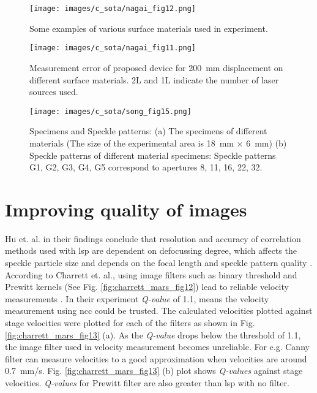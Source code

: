     \begin{figure}[h]
        \centering
        \texttt{[image: images/c\_sota/nagai\_fig12.png]}
        \caption{Some examples of various surface materials used in experiment. \cite{nagai}}
        \label{fig:nagai_fig12}
    \end{figure}

    \begin{figure}[h]
        \centering
        \texttt{[image: images/c\_sota/nagai\_fig11.png]}
        \caption{Measurement error of proposed device for \SI{200}{\milli\meter} displacement on different surface materials. 2L and 1L indicate the number of laser sources used. \cite{nagai}}
        \label{fig:nagai_fig11}
    \end{figure}
    
    \begin{figure}[h]
        \centering
        \texttt{[image: images/c\_sota/song\_fig15.png]}
        \caption{Specimens and Speckle patterns: (a) The specimens of different materials (The size of the experimental area is \SI{18}{\milli\meter} × \SI{6}{\milli\meter}) (b) Speckle patterns of different material specimens: Speckle patterns G1, G2, G3, G4, G5 correspond to apertures 8, 11, 16, 22, 32. \cite{song}}
        \label{fig:song_fig15}
    \end{figure}

    \clearpage

\section{Improving quality of images}

Hu et. al. in their findings conclude that resolution and accuracy of correlation methods used with \gls{lsp} are dependent on defocussing degree, which affects the speckle particle size and depends on the focal length and speckle pattern quality \cite{hu}. According to Charrett et. al., using image filters such as binary threshold and Prewitt kernels (See Fig. \ref{fig:charrett_mars_fig12}) lead to reliable velocity measurements \cite{charrett_mars}. In their experiment \emph{Q-value} of 1.1, means the velocity measurement using \gls{ncc} could be trusted. The calculated velocities plotted against stage velocities were plotted for each of the filters as shown in Fig. \ref{fig:charrett_mars_fig13} (a). As the \emph{Q-value} drops below the threshold of 1.1, the image filter used in velocity measurement becomes unreliable. For e.g. Canny filter can measure velocities to a good approximation when velocities are around \SI{0.7}{\milli\meter/\second}. Fig. \ref{fig:charrett_mars_fig13} (b) plot shows \emph{Q-values} against stage velocities. \emph{Q-values} for Prewitt filter are also greater than \gls{lsp} with no filter. 


